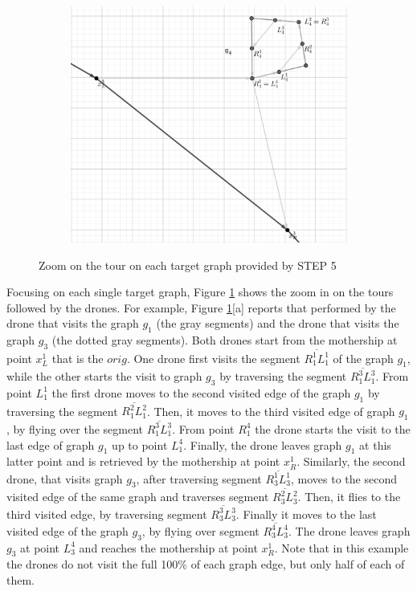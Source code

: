 \documentclass[10pt,a4paper]{elsarticle}
\newcommand{\EN}[1]{{\color{black}#1}}
\begin{document}
\begin{figure}[h!]
\begin{subfigure}[b]{0.4\textwidth}
		\caption{}%
	\end{subfigure}
	\begin{subfigure}[b]{0.4\textwidth}
		\includegraphics[width=\textwidth]{example_final-g4_gray.png}
		\caption{}
	\end{subfigure}%
	\caption{Zoom on the tour on each target graph provided by STEP 5}%
	\label{fig:example5}%
\end{figure}

\noindent 
Focusing on each single target graph, Figure \ref{fig:example5} shows the zoom \EN{in} on the tours followed by the drones. For example, Figure \ref{fig:example5}[a] reports th\EN{at} performed by the drone that visits the graph $g_1$ (the gray segments) and the drone that visits the graph $g_3$ (the dotted gray segments). Both drones start from the mothership at point $x^1_L$ that is the $orig$. One drone first visits the segment $\overline{R^1_1L^1_1}$ of the graph $g_1$, while the other starts the visit \EN{to} graph $g_3$ by traversing the segment $\overline{R^3_1L^3_1}$. From point $L^1_1$ the first drone moves to the second visited edge of the graph $g_1$ by traversing the segment $\overline{R^2_1L^2_1}$. Then, it moves to the third visited edge of graph $g_1$, by flying over the segment $\overline{R^3_1L^3_1}$. From point $R^4_1$ the drone starts the visit to the last edge of graph $g_1$ up to point $L^4_1$. 
Finally, the drone leaves graph $g_1$ at this latter point and is retrieved by the mothership at point $x^1_R$. Similarly, the second drone, that visits graph $g_3$, after traversing segment $\overline{R^1_3L^1_3}$, moves to the second visited edge of the same graph and traverses segment $\overline{R^2_3L^2_3}$. Then, it flies to the third visited edge, by traversing segment $\overline{R^3_3L^3_3}$. Finally it moves to the last visited edge of the graph $g_3$, by flying over segment $\overline{R^4_3L^4_3}$. The drone leaves graph $g_3$ at point $L^4_3$ and reaches the mothership at point $x_R^1$. 
Note that in this example the drones do not visit the full 100\% of each graph edge, but only half of each of them.
\end{document}
